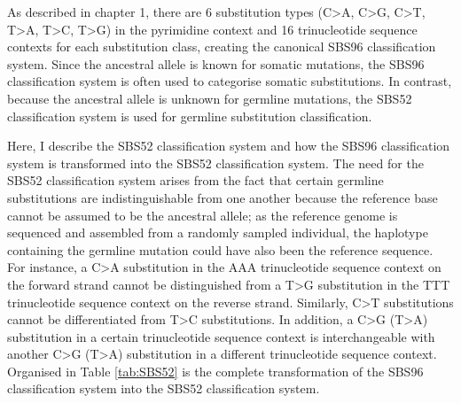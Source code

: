As described in chapter 1, there are 6 substitution types (C>A, C>G, C>T, T>A, T>C, T>G) in the pyrimidine context and 16 trinucleotide sequence contexts for each substitution class, creating the canonical SBS96 classification system. Since the ancestral allele is known for somatic mutations, the SBS96 classification system is often used to categorise somatic substitutions. In contrast, because the ancestral allele is unknown for germline mutations, the SBS52 classification system is used for germline substitution classification. 

Here, I describe the SBS52 classification system and how the SBS96 classification system is transformed into the SBS52 classification system. The need for the SBS52 classification system arises from the fact that certain germline substitutions are indistinguishable from one another because the reference base cannot be assumed to be the ancestral allele; as the reference genome is sequenced and assembled from a randomly sampled individual, the haplotype containing the germline mutation could have also been the reference sequence. For instance, a C>A substitution in the AAA trinucleotide sequence context on the forward strand cannot be distinguished from a T>G substitution in the TTT trinucleotide sequence context on the reverse strand. Similarly, C>T substitutions cannot be differentiated from T>C substitutions. In addition, a C>G (T>A) substitution in a certain trinucleotide sequence context is interchangeable with another C>G (T>A) substitution in a different trinucleotide sequence context. Organised in Table \ref{tab:SBS52} is the complete transformation of the SBS96 classification system into the SBS52 classification system. 


